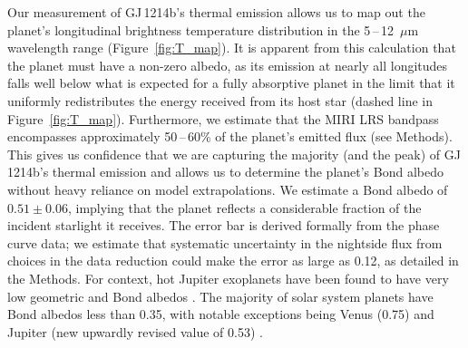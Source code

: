 \documentclass[pdflatex,sn-standardnature]{sn-jnl}%
\begin{document}
Our measurement of GJ\,1214b's thermal emission allows us to map out the planet's longitudinal brightness temperature distribution in the 5\,--\,12~$\mu$m wavelength range (Figure~\ref{fig:T_map}).  It is apparent from this calculation that the planet must have a non-zero albedo, as its emission at nearly all longitudes falls well below what is expected for a fully absorptive planet in the limit that it uniformly redistributes the energy received from its host star (dashed line in Figure~\ref{fig:T_map}).  Furthermore, we estimate that the MIRI LRS bandpass encompasses approximately 50\,--\,60\% of the planet's emitted flux (see Methods).  This gives us confidence that we are capturing the majority (and the peak) of GJ\,1214b's thermal emission and allows us to determine the planet's Bond albedo without heavy reliance on model extrapolations.  We estimate a Bond albedo of \mbox{$0.51 \pm 0.06$}, implying that the planet reflects a considerable fraction of the incident starlight it receives.  The error bar is derived formally from the phase curve data;  we estimate that systematic uncertainty in the nightside flux from choices in the data reduction could make the error as large as 0.12, as detailed in the Methods.  For context, hot Jupiter exoplanets have been found to have very low geometric and Bond albedos \cite{rowe08, stevenson14, brandeker22}.  The majority of solar system planets have Bond albedos less than 0.35, with notable exceptions being Venus (0.75) \cite{moroz81} and Jupiter (new upwardly revised value of 0.53) \cite{li18}.



\end{document}
